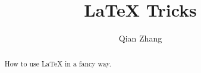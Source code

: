 \documentclass{article}
\begin{document}
\title{{\LaTeX} Tricks}

\author{Qian Zhang}

\maketitle

\begin{abstract}
    How to use {\LaTeX} in a fancy way.
\end{abstract}




\end{document}
